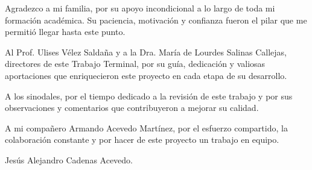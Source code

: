 \bigskip
\bigskip

Agradezco a mi familia, por su apoyo incondicional a lo largo de toda mi formación académica. Su paciencia, motivación y confianza fueron el pilar que me permitió llegar hasta este punto.

\bigskip

Al Prof. Ulises Vélez Saldaña y a la Dra. María de Lourdes Salinas Callejas, directores de este Trabajo Terminal, por su guía, dedicación y valiosas aportaciones que enriquecieron este proyecto en cada etapa de su desarrollo.

\bigskip

A los sinodales, por el tiempo dedicado a la revisión de este trabajo y por sus observaciones y comentarios que contribuyeron a mejorar su calidad.

\bigskip

A mi compañero Armando Acevedo Martínez, por el esfuerzo compartido, la colaboración constante y por hacer de este proyecto un trabajo en equipo.

\bigskip

\begin{flushright}
Jesús Alejandro Cadenas Acevedo.
\end{flushright}
